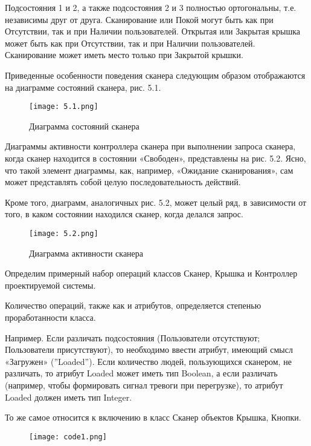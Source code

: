 \documentclass[12pt]{article}
\begin{document}
    Подсостояния 1 и 2, а также подсостояния 2 и 3 полностью ортогональны, т.е. независимы друг от друга. Сканирование или Покой могут быть как при Отсутствии, так и при Наличии пользователей. Открытая или Закрытая крышка может быть как при Отсутствии, так и при Наличии пользователей. Сканирование может иметь место только при Закрытой крышки.

    Приведенные особенности поведения сканера следующим образом отображаются на диаграмме состояний сканера, рис. 5.1.

    \newpage

    \begin{figure}[h]
        \texttt{[image: 5.1.png]}
        \centering
        \caption{Диаграмма состояний сканера}
    \end{figure}

    Диаграммы активности контроллера сканера при выполнении запроса сканера, когда сканер находится в состоянии «Свободен», представлены на рис. 5.2.
    Ясно, что такой элемент диаграммы, как, например,  «Ожидание сканирования», сам может представлять собой целую последовательность действий.

    Кроме того, диаграмм, аналогичных рис. 5.2, может целый ряд, в зависимости от того, в каком состоянии находился сканер, когда делался запрос.

    \newpage

    \begin{figure}[h]
        \texttt{[image: 5.2.png]}
        \centering
        \caption{Диаграмма активности сканера}
    \end{figure}

    \newpage

    Определим примерный набор операций классов Сканер, Крышка и Контроллер проектируемой системы.

    Количество операций, также как и атрибутов, определяется степенью проработанности класса.

    Например. Если различать подсостояния (Пользователи отсутствуют; Пользователи присутствуют), то необходимо ввести атрибут, имеющий смысл «Загружен» (''Loaded''). Если количество людей, пользующихся сканером, не различать, то атрибут Loaded может иметь тип Boolean, а если различать (например, чтобы формировать сигнал тревоги при перегрузке), то атрибут Loaded должен иметь тип Integer.

    То же самое относится к включению в класс Сканер объектов Крышка, Кнопки.

    \begin{figure}[h]
        \texttt{[image: code1.png]}
    \end{figure}
\end{document}
